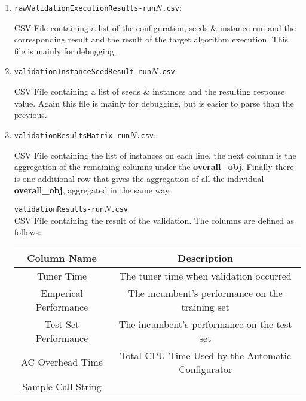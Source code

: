 \documentclass[manual.tex]{subfiles}
\begin{document}
\begin{enumerate}


\item \texttt{rawValidationExecutionResults-run$N$.csv}:

 CSV File containing a list of the configuration, 
seeds \& instance run and the corresponding result and the result of the target algorithm execution. This file is mainly for debugging.

\item 
\texttt{validationInstanceSeedResult-run$N$.csv}:

 CSV File containing a list of seeds \&
instances and the resulting response value. Again this file is mainly for debugging, but is easier to parse than the previous.
\item 
\texttt{validationResultsMatrix-run$N$.csv}:

CSV File containing the list of instances
on each line, the next column is the aggregation of the remaining columns under the 
\textbf{overall\_obj}. Finally there is one additional row that
gives the aggregation of all the individual \textbf{overall\_obj},
aggregated in the same way.

\texttt{validationResults-run$N$.csv}
\\
CSV File containing the result of the validation. The columns are defined as follows:

\begin{tabular}{|c|c|}
\hline 
Column Name & Description\tabularnewline
\hline 
\hline 
Tuner Time &  The tuner time when validation occurred \tabularnewline
\hline 
Emperical Performance & The incumbent's performance on the training set \tabularnewline
\hline 
Test Set Performance & The incumbent's performance on the test set \tabularnewline
\hline
AC Overhead Time & Total CPU Time Used by the Automatic Configurator  \tabularnewline
\hline 
Sample Call String \tabularnewline
\hline

\end{tabular}




\end{enumerate}
\end{document}
